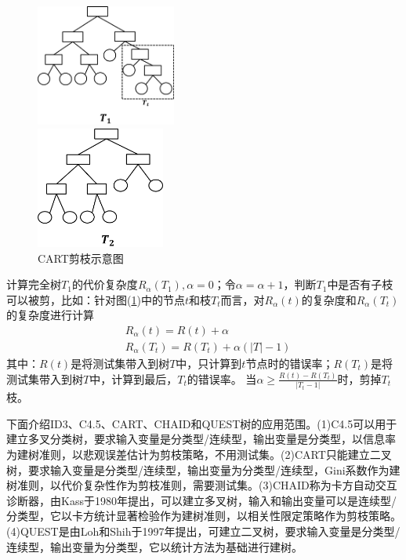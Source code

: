             	\begin{figure}[H]
  				\centering
  				\begin{varwidth}[t]{\textwidth}
    			\vspace{0pt}
    			\includegraphics[height=4cm]{images/CART1.jpg}
  				\end{varwidth}
  				\qquad \qquad
  				\begin{varwidth}[t]{\textwidth}
    			\vspace{0pt}
    			\includegraphics[height=4cm]{images/CART2.jpg}
  				\end{varwidth}
                \caption{CART剪枝示意图}
                \label{fig:CART剪枝示意图}
				\end{figure}
            计算完全树$T_1$的代价复杂度$R_\alpha(T_1),\alpha = 0$；令$\alpha = \alpha+1$，判断$T_1$中是否有子枝可以被剪，比如：针对图(\ref{fig:CART剪枝示意图})中的节点$t$和枝$T_t$而言，对$R_\alpha(t)$的复杂度和$R_\alpha(T_t)$的复杂度进行计算
            \begin{align*}
            & R_\alpha(t) = R(t)+\alpha \\
            & R_\alpha(T_t) = R(T_t)+\alpha(|T| - 1)
            \end{align*}
            其中：$R(t)$是将测试集带入到树$T$中，只计算到$t$节点时的错误率；$R(T_t)$是将测试集带入到树$T$中，计算到最后，$T_t$的错误率。
            当$\alpha \geqslant \frac{R(t)-R(T_t)}{|T_t-1|}$时，剪掉$T_t$枝。
            \par
            下面介绍ID3、C4.5、CART、CHAID和QUEST树的应用范围。(1)C4.5可以用于建立多叉分类树，要求输入变量是分类型/连续型，输出变量是分类型，以信息率为建树准则，以悲观误差估计为剪枝策略，不用测试集。(2)CART只能建立二叉树，要求输入变量是分类型/连续型，输出变量为分类型/连续型，Gini系数作为建树准则，以代价复杂性作为剪枝准则，需要测试集。(3)CHAID称为卡方自动交互诊断器，由Kass于1980年提出，可以建立多叉树，输入和输出变量可以是连续型/分类型，它以卡方统计显著检验作为建树准则，以相关性限定策略作为剪枝策略。(4)QUEST是由Loh和Shih于1997年提出，可建立二叉树，要求输入变量是分类型/连续型，输出变量为分类型，它以统计方法为基础进行建树。

